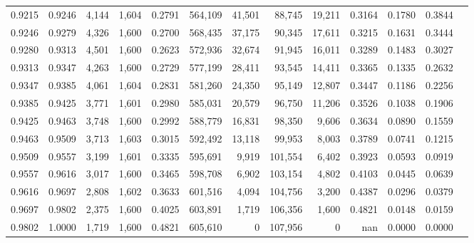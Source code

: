 \begin{tabular}{rrrrrrrrrrrrr}
0.9215 & 0.9246 &  4,144 & 1,604 &                                     0.2791 & 564,109 &  41,501 &  88,745 &  19,211 & 0.3164 & 0.1780 & 0.3844 \\
0.9246 & 0.9279 &  4,326 & 1,600 &                                     0.2700 & 568,435 &  37,175 &  90,345 &  17,611 & 0.3215 & 0.1631 & 0.3444 \\
0.9280 & 0.9313 &  4,501 & 1,600 &                                     0.2623 & 572,936 &  32,674 &  91,945 &  16,011 & 0.3289 & 0.1483 & 0.3027 \\
0.9313 & 0.9347 &  4,263 & 1,600 &                                     0.2729 & 577,199 &  28,411 &  93,545 &  14,411 & 0.3365 & 0.1335 & 0.2632 \\
0.9347 & 0.9385 &  4,061 & 1,604 &                                     0.2831 & 581,260 &  24,350 &  95,149 &  12,807 & 0.3447 & 0.1186 & 0.2256 \\
0.9385 & 0.9425 &  3,771 & 1,601 &                                     0.2980 & 585,031 &  20,579 &  96,750 &  11,206 & 0.3526 & 0.1038 & 0.1906 \\
0.9425 & 0.9463 &  3,748 & 1,600 &                                     0.2992 & 588,779 &  16,831 &  98,350 &   9,606 & 0.3634 & 0.0890 & 0.1559 \\
0.9463 & 0.9509 &  3,713 & 1,603 &                                     0.3015 & 592,492 &  13,118 &  99,953 &   8,003 & 0.3789 & 0.0741 & 0.1215 \\
0.9509 & 0.9557 &  3,199 & 1,601 &                                     0.3335 & 595,691 &   9,919 & 101,554 &   6,402 & 0.3923 & 0.0593 & 0.0919 \\
0.9557 & 0.9616 &  3,017 & 1,600 &                                     0.3465 & 598,708 &   6,902 & 103,154 &   4,802 & 0.4103 & 0.0445 & 0.0639 \\
0.9616 & 0.9697 &  2,808 & 1,602 &                                     0.3633 & 601,516 &   4,094 & 104,756 &   3,200 & 0.4387 & 0.0296 & 0.0379 \\
0.9697 & 0.9802 &  2,375 & 1,600 &                                     0.4025 & 603,891 &   1,719 & 106,356 &   1,600 & 0.4821 & 0.0148 & 0.0159 \\
0.9802 & 1.0000 &  1,719 & 1,600 &                                     0.4821 & 605,610 &       0 & 107,956 &       0 &    nan & 0.0000 & 0.0000 \\
\bottomrule
\end{tabular}
